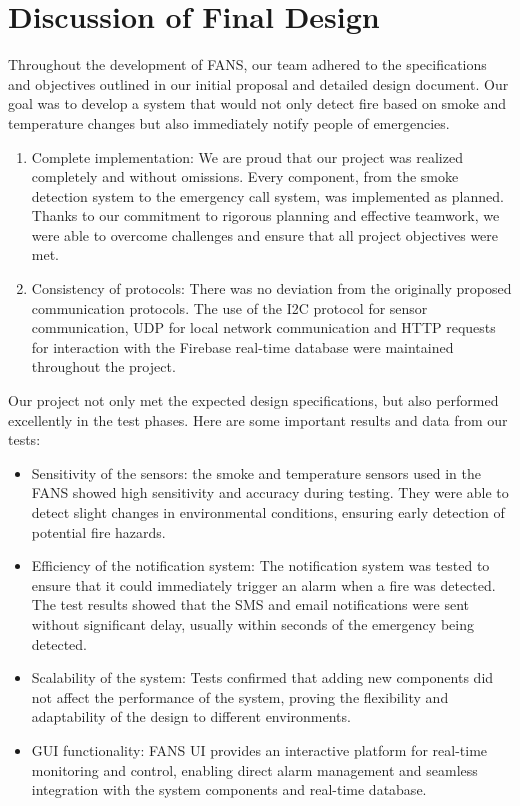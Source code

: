 \section{Discussion of Final Design}

Throughout the development of FANS, our team adhered to the specifications and objectives outlined in our initial
proposal and detailed design document. Our goal was to develop a system that would not only detect fire based on smoke
and temperature changes but also immediately notify people of emergencies.

\begin{enumerate}
    \item Complete implementation: We are proud that our project was realized completely and without omissions. Every component, from the smoke detection system to the emergency call system, was implemented as planned. Thanks to our commitment to rigorous planning and effective teamwork, we were able to overcome challenges and ensure that all project objectives were met.
    \item Consistency of protocols: There was no deviation from the originally proposed communication protocols. The use of the I2C protocol for sensor communication, UDP for local network communication and HTTP requests for interaction with the Firebase real-time database were maintained throughout the project.
\end{enumerate}

Our project not only met the expected design specifications, but also performed excellently in the test phases. Here are
some important results and data from our tests:

\begin{itemize}
    \item Sensitivity of the sensors: the smoke and temperature sensors used in the FANS showed high sensitivity and accuracy during testing. They were able to detect slight changes in environmental conditions, ensuring early detection of potential fire hazards. 
    \item Efficiency of the notification system: The notification system was tested to ensure that it could immediately trigger an alarm when a fire was detected. The test results showed that the SMS and email notifications were sent without significant delay, usually within seconds of the emergency being detected. 
    \item Scalability of the system: Tests confirmed that adding new components did not affect the performance of the system, proving the flexibility and adaptability of the design to different environments.
    \item GUI functionality: FANS UI provides an interactive platform for real-time monitoring and control, enabling direct alarm management and seamless integration with the system components and real-time database. 
\end{itemize}

